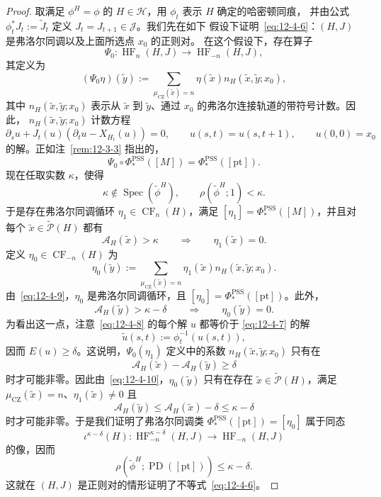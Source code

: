 \begin{proof}
取满足 $\phi^H=\phi$ 的 $H\in\mathcal H$，用 $\phi_t$ 表示 $H$ 确定的哈密顿同痕，
并由公式 $\phi_t^*J_t:=\widetilde J_t$ 定义 $J_t=J_{t+1}\in\mathcal J$。我们先在如下
假设下证明~\eqref{eq:12-4-6}：$(H,J)$ 是弗洛尔同调以及上面所选点 $x_0$ 的正则对。
在这个假设下，存在算子
\[
  \Psi_0:\operatorname{HF}_n(H,J)\longrightarrow\operatorname{HF}_{-n}(H,J),
\]
其定义为
\[
  (\Psi_0\eta)(\widetilde y)
  :=\sum_{\mu_{\mathrm{CZ}}(\widetilde x)=n}
  \eta(\widetilde x)n_H(\widetilde x,\widetilde y;x_0),
\]
其中 $n_H(\widetilde x,\widetilde y;x_0)$ 表示从 $\widetilde x$ 到 $\widetilde y$、通过
$x_0$ 的弗洛尔连接轨道的带符号计数。因此，
$n_H(\widetilde x,\widetilde y;x_0)$ 计数方程
\begin{equation}\label{eq:12-4-8}
  \partial_su+J_t(u)(\partial_tu-X_{H_t}(u))=0,
  \qquad u(s,t)=u(s,t+1),
  \qquad u(0,0)=x_0
\end{equation}
的解。正如注~\ref{rem:12-3-3} 指出的，
\begin{equation}\label{eq:12-4-9}
  \Psi_0\circ\Phi_*^{\mathrm{PSS}}([M])
  =\Phi_*^{\mathrm{PSS}}([\mathrm{pt}]).
\end{equation}
现在任取实数 $\kappa$，使得
\[
  \kappa\notin\operatorname{Spec}(\widetilde\phi^H),
  \qquad \rho(\widetilde\phi^H;1)<\kappa.
\]
于是存在弗洛尔同调循环 $\eta_1\in\operatorname{CF}_n(H)$，满足
$[\eta_1]=\Phi_*^{\mathrm{PSS}}([M])$，并且对每个
$\widetilde x\in\widetilde{\mathcal P}(H)$ 都有
\begin{equation}\label{eq:12-4-10}
  \mathcal A_H(\widetilde x)>\kappa
  \qquad\Longrightarrow\qquad \eta_1(\widetilde x)=0.
\end{equation}
定义 $\eta_0\in\operatorname{CF}_{-n}(H)$ 为
\[
  \eta_0(\widetilde y)
  :=\sum_{\mu_{\mathrm{CZ}}(\widetilde x)=n}
  \eta_1(\widetilde x)n_H(\widetilde x,\widetilde y;x_0).
\]
由~\eqref{eq:12-4-9}，$\eta_0$ 是弗洛尔同调循环，且
$[\eta_0]=\Phi_*^{\mathrm{PSS}}([\mathrm{pt}])$。此外，
\[
  \mathcal A_H(\widetilde y)>\kappa-\delta
  \qquad\Longrightarrow\qquad\eta_0(\widetilde y)=0.
\]
为看出这一点，注意~\eqref{eq:12-4-8} 的每个解 $u$ 都等价于
\eqref{eq:12-4-7} 的解
\[
  \widetilde u(s,t):=\phi_t^{-1}(u(s,t)),
\]
因而 $E(u)\ge\delta$。这说明，$\Psi_0(\eta_1)$ 定义中的系数
$n_H(\widetilde x,\widetilde y;x_0)$ 只有在
\[
  \mathcal A_H(\widetilde x)-\mathcal A_H(\widetilde y)\ge\delta
\]
时才可能非零。因此由~\eqref{eq:12-4-10}，$\eta_0(\widetilde y)$ 只有在存在
$\widetilde x\in\widetilde{\mathcal P}(H)$，满足
$\mu_{\mathrm{CZ}}(\widetilde x)=n$、$\eta_1(\widetilde x)\ne0$ 且
\[
  \mathcal A_H(\widetilde y)
  \le\mathcal A_H(\widetilde x)-\delta\le\kappa-\delta
\]
时才可能非零。于是我们证明了弗洛尔同调类
$\Phi_*^{\mathrm{PSS}}([\mathrm{pt}])=[\eta_0]$ 属于同态
\[
  \iota^{\kappa-\delta}(H):
  \operatorname{HF}_{-n}^{\kappa-\delta}(H,J)
  \longrightarrow\operatorname{HF}_{-n}(H,J)
\]
的像，因而
\[
  \rho(\widetilde\phi^H;\operatorname{PD}([\mathrm{pt}]))
  \le\kappa-\delta.
\]
这就在 $(H,J)$ 是正则对的情形证明了不等式~\eqref{eq:12-4-6}。


\end{proof}

